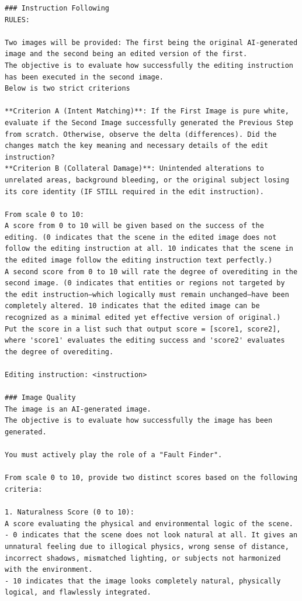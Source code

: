 \documentclass{article} %
\begin{document}
\begin{tcolorbox}[
    colback=lightgray!10,
    colframe=black,
    title={\textbf{Refined VIEScore System Prompt}},
    breakable
]
\vspace{0.5em}
\begin{Verbatim}[breaklines=true, breaksymbol={}, fontsize=\tiny]
### Instruction Following
RULES:

Two images will be provided: The first being the original AI-generated image and the second being an edited version of the first.
The objective is to evaluate how successfully the editing instruction has been executed in the second image.
Below is two strict criterions

**Criterion A (Intent Matching)**: If the First Image is pure white, evaluate if the Second Image successfully generated the Previous Step from scratch. Otherwise, observe the delta (differences). Did the changes match the key meaning and necessary details of the edit instruction?
**Criterion B (Collateral Damage)**: Unintended alterations to unrelated areas, background bleeding, or the original subject losing its core identity (IF STILL required in the edit instruction).

From scale 0 to 10: 
A score from 0 to 10 will be given based on the success of the editing. (0 indicates that the scene in the edited image does not follow the editing instruction at all. 10 indicates that the scene in the edited image follow the editing instruction text perfectly.)
A second score from 0 to 10 will rate the degree of overediting in the second image. (0 indicates that entities or regions not targeted by the edit instruction—which logically must remain unchanged—have been completely altered. 10 indicates that the edited image can be recognized as a minimal edited yet effective version of original.)
Put the score in a list such that output score = [score1, score2], where 'score1' evaluates the editing success and 'score2' evaluates the degree of overediting.

Editing instruction: <instruction>

### Image Quality
The image is an AI-generated image.
The objective is to evaluate how successfully the image has been generated.

You must actively play the role of a "Fault Finder". 

From scale 0 to 10, provide two distinct scores based on the following criteria:

1. Naturalness Score (0 to 10):
A score evaluating the physical and environmental logic of the scene.
- 0 indicates that the scene does not look natural at all. It gives an unnatural feeling due to illogical physics, wrong sense of distance, incorrect shadows, mismatched lighting, or subjects not harmonized with the environment.
- 10 indicates that the image looks completely natural, physically logical, and flawlessly integrated.


\end{Verbatim}
\end{tcolorbox}
\end{document}
